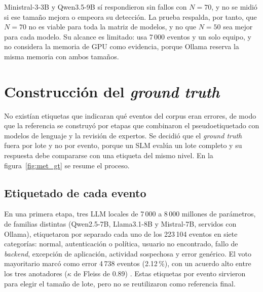 Ministral-3-3B y Qwen3.5-9B sí respondieron sin fallos con $N = 70$, y no se midió si ese tamaño mejora o empeora su detección. La prueba respalda, por tanto, que $N = 70$ no es viable para toda la matriz de modelos, y no que $N = 50$ sea mejor para cada modelo. Su alcance es limitado: usa 7\,000 eventos y un solo equipo, y no considera la memoria de GPU como evidencia, porque Ollama reserva la misma memoria con ambos tamaños.

\section{Construcción del \textit{ground truth}}\label{sec:met_gt}

No existían etiquetas que indicaran qué eventos del corpus eran errores, de modo que la referencia se construyó por etapas que combinaron el pseudoetiquetado con modelos de lenguaje y la revisión de expertos. Se decidió que el \textit{ground truth} fuera por lote y no por evento, porque un SLM evalúa un lote completo y su respuesta debe compararse con una etiqueta del mismo nivel. En la figura~\ref{fig:met_gt} se resume el proceso.


\subsection{Etiquetado de cada evento}

En una primera etapa, tres LLM locales de 7\,000 a 8\,000 millones de parámetros, de familias distintas (Qwen2.5-7B, Llama3.1-8B y Mistral-7B, servidos con Ollama), etiquetaron por separado cada uno de los 223\,104 eventos en siete categorías: normal, autenticación o política, usuario no encontrado, fallo de \textit{backend}, excepción de aplicación, actividad sospechosa y error genérico. El voto mayoritario marcó como error 4\,738 eventos (2.12\,\%), con un acuerdo alto entre los tres anotadores ($\kappa$ de Fleiss de 0.89) \cite{fleiss1971_kappa}. Estas etiquetas por evento sirvieron para elegir el tamaño de lote, pero no se reutilizaron como referencia final.

